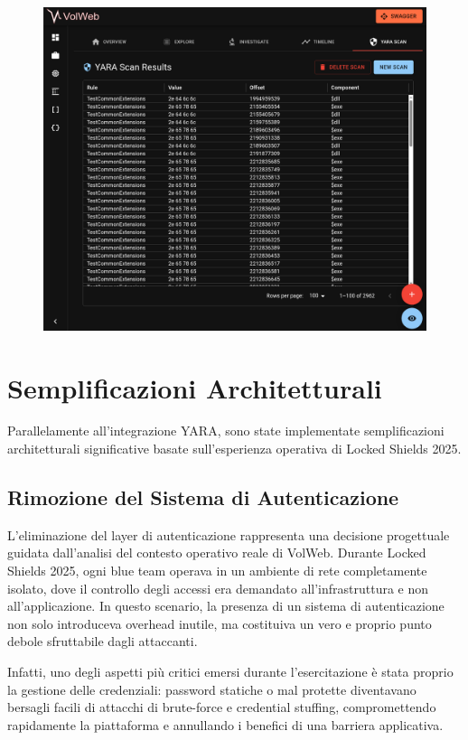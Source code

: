 \begin{figure}[H]
\centering
\includegraphics[width=1\linewidth]{images/volweb-esteso/volweb-scanresult.png}
\end{figure}


\section{Semplificazioni Architetturali}
Parallelamente all'integrazione YARA, sono state implementate semplificazioni architetturali significative basate sull'esperienza operativa di Locked Shields 2025.

\subsection{Rimozione del Sistema di Autenticazione}
L'eliminazione del layer di autenticazione rappresenta una decisione progettuale guidata dall'analisi del contesto operativo reale di VolWeb. Durante Locked Shields 2025, ogni blue team operava in un ambiente di rete completamente isolato, dove il controllo degli accessi era demandato all’infrastruttura e non all’applicazione. In questo scenario, la presenza di un sistema di autenticazione non solo introduceva overhead inutile, ma costituiva un vero e proprio punto debole sfruttabile dagli attaccanti.

Infatti, uno degli aspetti più critici emersi durante l’esercitazione è stata proprio la gestione delle credenziali: password statiche o mal protette diventavano bersagli facili di attacchi di brute-force e credential stuffing, compromettendo rapidamente la piattaforma e annullando i benefici di una barriera applicativa.

